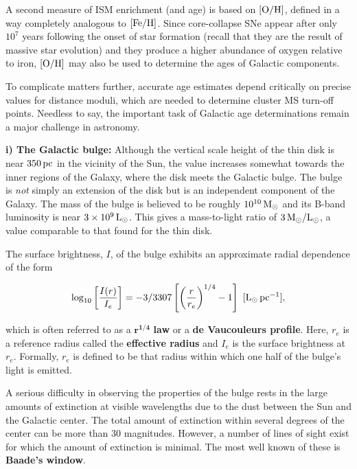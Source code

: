 \documentclass[a4paper,10pt]{article}
\begin{document}
{\noindent}A second measure of ISM enrichment (and age) is based on $[{\rm O/H}]$, defined in a way completely analogous to $[{\rm Fe/H}]$. Since core-collapse SNe appear after only $10^7$ years following the onset of star formation (recall that they are the result of massive star evolution) and they produce a higher abundance of oxygen relative to iron, $[{\rm O/H}]$ may also be used to determine the ages of Galactic components.

{\noindent}To complicate matters further, accurate age estimates depend critically on precise values for distance moduli, which are needed to determine cluster MS turn-off points. Needless to say, the important task of Galactic age determinations remain a major challenge in astronomy.

{\noindent}\textbf{i) The Galactic bulge:} Although the vertical scale height of the thin disk is near $350\,{\rm pc}$ in the vicinity of the Sun, the value increases somewhat towards the inner regions of the Galaxy, where the disk meets the Galactic bulge. The bulge is \textit{not} simply an extension of the disk but is an independent component of the Galaxy. The mass of the bulge is believed to be roughly $10^{10}\,{\rm M_\odot}$ and its B-band luminosity is near $3\times10^9\,{\rm L_\odot}$. This gives a mass-to-light ratio of $3\,{\rm M_\odot/L_\odot}$, a value comparable to that found for the thin disk.

{\noindent}The surface brightness, $I$, of the bulge exhibits an approximate radial dependence of the form

\begin{align*}
    \log_{10} \left[\frac{I(r)}{I_e}\right] = -3/3307 \left[\left(\frac{r}{r_e}\right)^{1/4} -1\right] ~ [{\rm L_\odot\,pc^{-1}}],
\end{align*}

{\noindent}which is often referred to as a $\mathbf{r^{1/4}}$ \textbf{law} or a \textbf{de Vaucouleurs profile}. Here, $r_e$ is a reference radius called the \textbf{effective radius} and $I_e$ is the surface brightness at $r_e$. Formally, $r_e$ is defined to be that radius within which one half of the bulge's light is emitted. 

{\noindent}A serious difficulty in observing the properties of the bulge rests in the large amounts of extinction at visible wavelengths due to the dust between the Sun and the Galactic center. The total amount of extinction within several degrees of the center can be more than $30$ magnitudes. However, a number of lines of sight exist for which the amount of extinction is minimal. The most well known of these is \textbf{Baade's window}.
\end{document}

